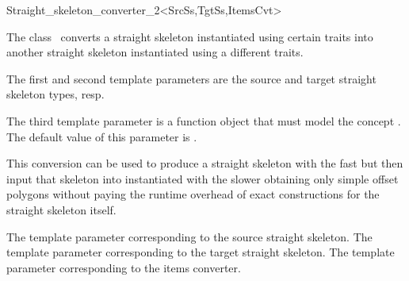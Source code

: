 

\begin{ccRefClass}{Straight_skeleton_converter_2<SrcSs,TgtSs,ItemsCvt>}


\ccDefinition

The class \ccRefName\ converts a straight skeleton instantiated using certain traits into another straight skeleton instantiated using a different traits.

The first and second template parameters are the source and target straight skeleton types, resp.

The third template parameter  is a function object that must
model the concept . The default value of this parameter is .

This conversion can be used to produce a straight skeleton with the fast
 but then input that skeleton
into  instantiated with the slower  obtaining only simple offset
polygons without paying the runtime overhead of exact constructions for the straight 
skeleton itself.

\ccTypes
{}
  {The  template parameter corresponding to the source straight skeleton.}
\ccGlue
{}
  {The  template parameter corresponding to the target straight skeleton.}
\ccGlue
{}
  {The  template parameter corresponding to the items converter.}



\end{ccRefClass}
